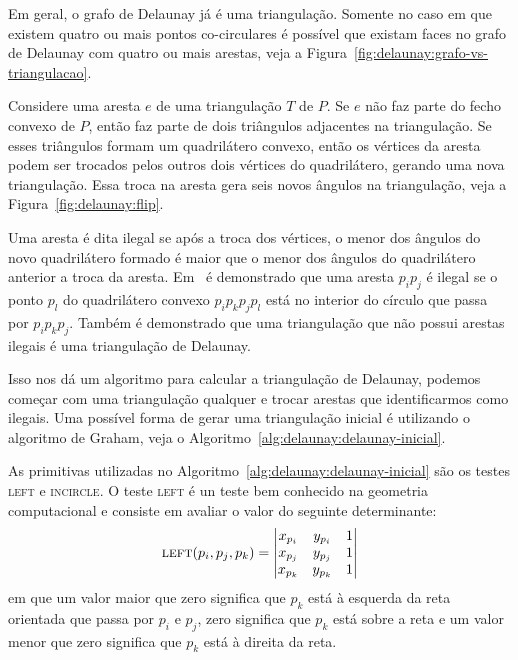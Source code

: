 

Em geral, o grafo de Delaunay já é uma triangulação.
Somente no caso em que existem quatro ou mais pontos co-circulares é possível que existam faces no
grafo de Delaunay com quatro ou mais arestas, veja a
Figura~\ref{fig:delaunay:grafo-vs-triangulacao}.



Considere uma aresta $e$ de uma triangulação $T$ de $P$.
Se $e$ não faz parte do fecho convexo de $P$, então faz parte de dois triângulos adjacentes na
triangulação.
Se esses triângulos formam um quadrilátero convexo, então os vértices da aresta podem ser trocados
pelos outros dois vértices do quadrilátero, gerando uma nova triangulação.
Essa troca na aresta gera seis novos ângulos na triangulação, veja a
Figura~\ref{fig:delaunay:flip}.



Uma aresta é dita ilegal se após a troca dos vértices, o menor dos ângulos do novo quadrilátero
formado é maior que o menor dos ângulos do quadrilátero anterior a troca da aresta.
Em~\cite{computationalgeometry} é demonstrado que uma aresta $p_{i}p_{j}$ é ilegal se o ponto
$p_{l}$ do quadrilátero convexo $p_{i}p_{k}p_{j}p_{l}$ está no interior do círculo que passa por
$p_{i}p_{k}p_{j}$.
Também é demonstrado que uma triangulação que não possui arestas ilegais é uma triangulação de
Delaunay.

Isso nos dá um algoritmo para calcular a triangulação de Delaunay, podemos começar com uma
triangulação qualquer e trocar arestas que identificarmos como ilegais.
Uma possível forma de gerar uma triangulação inicial é utilizando o algoritmo de Graham, veja o
Algoritmo~\ref{alg:delaunay:delaunay-inicial}.



As primitivas utilizadas no Algoritmo~\ref{alg:delaunay:delaunay-inicial} são os testes
\textsc{left} e \textsc{incircle}.
O teste \textsc{left} é un teste bem conhecido na geometria computacional e consiste em avaliar o
valor do seguinte determinante:
$$\textsc{left}(p_i, p_j, p_k) =
\begin{vmatrix}
    x_{p_i} & y_{p_i} & 1 \\
    x_{p_j} & y_{p_j} & 1 \\
    x_{p_k} & y_{p_k} & 1
\end{vmatrix}$$
em que um valor maior que zero significa que $p_k$ está à esquerda da reta orientada que passa por
$p_i$ e $p_j$, zero significa que $p_k$ está sobre a reta e um valor menor que zero significa que
$p_k$ está à direita da reta.

